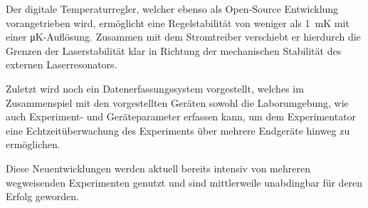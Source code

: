 Der digitale Temperaturregler, welcher ebenso als Open-Source Entwicklung vorangetrieben wird, ermöglicht eine Regelstabilität von weniger als \qty{1}{\milli\kelvin} mit einer \unit{\micro\kelvin}-Auflösung. Zusammen mit dem Stromtreiber verschiebt er hierdurch die Grenzen der Laserstabilität klar in Richtung der mechanischen Stabilität des externen Laserresonators.

Zuletzt wird noch ein Datenerfassungssystem vorgestellt, welches im Zusammenspiel mit den vorgestellten Geräten sowohl die Laborumgebung, wie auch Experiment- und Geräteparameter erfassen kann, um dem Experimentator eine Echtzeitüberwachung des Experiments über mehrere Endgeräte hinweg zu ermöglichen.

Diese Neuentwicklungen werden aktuell bereits intensiv von mehreren wegweisenden Experimenten genutzt und sind mittlerweile unabdingbar für deren Erfolg geworden.

